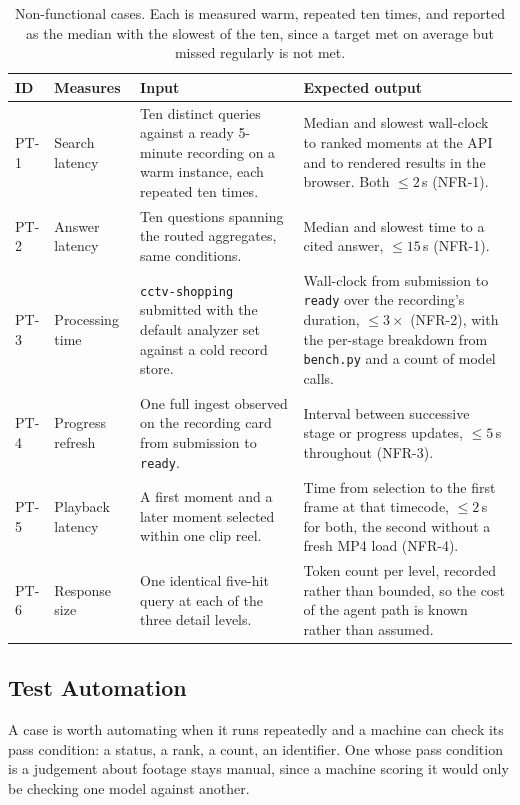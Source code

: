 \documentclass[11pt,a4paper]{article}
\begin{document}
\begin{table}[htbp]
\centering
\scriptsize
\begin{tabularx}{\textwidth}{@{}L{0.85cm}L{1.8cm}XX@{}}
\toprule
\textbf{ID} & \textbf{Measures} & \textbf{Input} & \textbf{Expected output} \\
\midrule
PT-1 & Search latency & Ten distinct queries against a ready 5-minute recording on a warm instance, each repeated ten times. & Median and slowest wall-clock to ranked moments at the API and to rendered results in the browser. Both $\leq 2$\,s (NFR-1). \\
PT-2 & Answer latency & Ten questions spanning the routed aggregates, same conditions. & Median and slowest time to a cited answer, $\leq 15$\,s (NFR-1). \\
PT-3 & Processing time & \texttt{cctv-shopping} submitted with the default analyzer set against a cold record store. & Wall-clock from submission to \texttt{ready} over the recording's duration, $\leq 3\times$ (NFR-2), with the per-stage breakdown from \texttt{bench.py} and a count of model calls. \\
PT-4 & Progress refresh & One full ingest observed on the recording card from submission to \texttt{ready}. & Interval between successive stage or progress updates, $\leq 5$\,s throughout (NFR-3). \\
PT-5 & Playback latency & A first moment and a later moment selected within one clip reel. & Time from selection to the first frame at that timecode, $\leq 2$\,s for both, the second without a fresh MP4 load (NFR-4). \\
PT-6 & Response size & One identical five-hit query at each of the three detail levels. & Token count per level, recorded rather than bounded, so the cost of the agent path is known rather than assumed. \\
\bottomrule
\end{tabularx}
\caption{Non-functional cases. Each is measured warm, repeated ten times, and
reported as the median with the slowest of the ten, since a target met on
average but missed regularly is not met.}
\end{table}

\subsection{Test Automation}

A case is worth automating when it runs repeatedly and a machine can check its
pass condition: a status, a rank, a count, an identifier. One whose pass
condition is a judgement about footage stays manual, since a machine scoring it
would only be checking one model against another.
\end{document}
